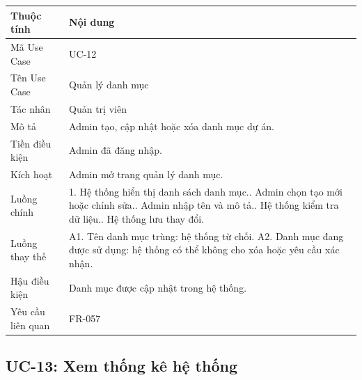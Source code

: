 \begin{longtable}{|p{3.5cm}|p{10.2cm}|}
\hline
\textbf{Thuộc tính} & \textbf{Nội dung} \\ \hline
Mã Use Case & UC-12 \\ \hline
Tên Use Case & Quản lý danh mục \\ \hline
Tác nhân & Quản trị viên \\ \hline
Mô tả & Admin tạo, cập nhật hoặc xóa danh mục dự án. \\ \hline
Tiền điều kiện & Admin đã đăng nhập. \\ \hline
Kích hoạt & Admin mở trang quản lý danh mục. \\ \hline
Luồng chính &
1. Hệ thống hiển thị danh sách danh mục.\newline
2. Admin chọn tạo mới hoặc chỉnh sửa.\newline
3. Admin nhập tên và mô tả.\newline
4. Hệ thống kiểm tra dữ liệu.\newline
5. Hệ thống lưu thay đổi. \\ \hline
Luồng thay thế &
A1. Tên danh mục trùng: hệ thống từ chối.\newline
A2. Danh mục đang được sử dụng: hệ thống có thể không cho xóa hoặc yêu cầu xác nhận. \\ \hline
Hậu điều kiện & Danh mục được cập nhật trong hệ thống. \\ \hline
Yêu cầu liên quan & FR-057 \\ \hline
\end{longtable}

\subsection{UC-13: Xem thống kê hệ thống}

